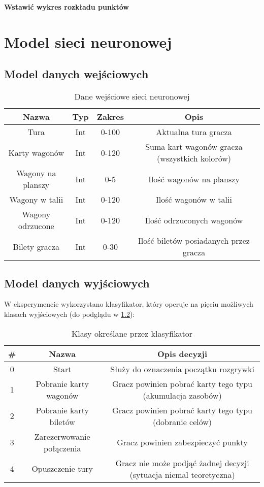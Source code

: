 \documentclass[12pt, oneside]{report}
\begin{document}
\textbf{Wstawić wykres rozkładu punktów}

\chapter{Model sieci neuronowej}
\section{Model danych wejściowych}
\begin{table}[h]
		\begin{tabular}{| c | c | c | c |} \hline
			Nazwa & Typ & Zakres & Opis \\ \hline
			Tura & Int & 0-100 & Aktualna tura gracza \\ \hline
			Karty wagonów & Int & 0-120 & Suma kart wagonów gracza (wszystkich kolorów) \\ \hline
			Wagony na planszy & Int & 0-5 & Ilość wagonów na planszy \\ \hline
			Wagony w talii & Int & 0-120 & Ilość wagonów w talii \\ \hline
			Wagony odrzucone & Int & 0-120 & Ilość odrzuconych wagonów \\ \hline
			Bilety gracza & Int & 0-30 & Ilość biletów posiadanych przez gracza \\ \hline
		\end{tabular}	
		\caption{Dane wejściowe sieci neuronowej}
		\label{table:algo_input}
\end{table}
\section{Model danych wyjściowych}
W eksperymencie wykorzystano klasyfikator, który operuje na pięciu możliwych klasach wyjściowych (do podglądu w \ref{table:algo_classifcator}):
\begin{table}[h]	
	\begin{center}
		\begin{tabular}{| c | c | c |} \hline
			\# & Nazwa & Opis decyzji \\ \hline
			0 & Start & Służy do oznaczenia początku rozgrywki \\ \hline
			1 & Pobranie karty wagonów & Gracz powinien pobrać karty tego typu (akumulacja zasobów) \\ \hline
			2 & Pobranie karty biletów & Gracz powinien pobrać karty tego typu (dobranie celów) \\ \hline
			3 & Zarezerwowanie połączenia & Gracz powinien zabezpieczyć punkty \\ \hline
			4 & Opuszczenie tury & Gracz nie może podjąć żadnej decyzji (sytuacja niemal teoretyczna) \\ \hline
		\end{tabular}
		\caption{Klasy określane przez klasyfikator}
		\label{table:algo_classifcator}
	\end{center}
\end{table}
\end{document}
